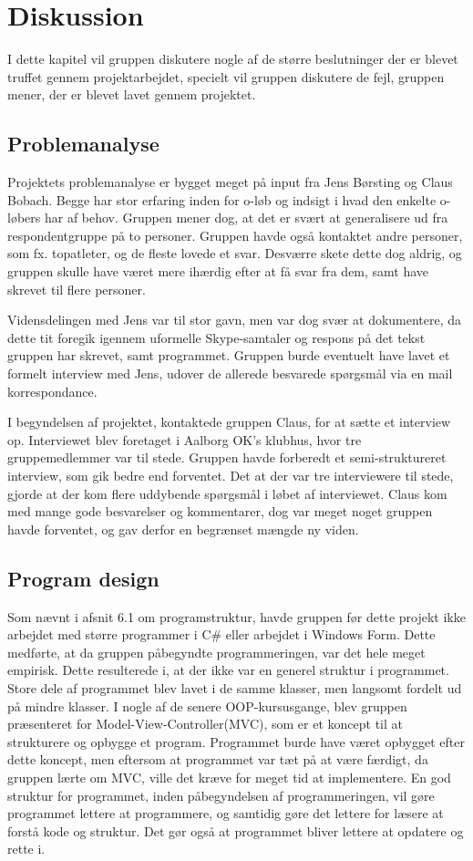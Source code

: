 \chapter{Diskussion}
I dette kapitel vil gruppen diskutere nogle af de større beslutninger der er blevet truffet gennem projektarbejdet, specielt vil gruppen diskutere de fejl, gruppen mener, der er blevet lavet gennem projektet. 
\section{Problemanalyse}
Projektets problemanalyse er bygget meget på input fra Jens Børsting og Claus Bobach. Begge har stor erfaring inden for o-løb og indsigt i hvad den enkelte o-løbers har af behov. Gruppen mener dog, at det er svært at generalisere ud fra respondentgruppe på to personer. Gruppen havde også kontaktet andre personer, som fx. topatleter, og de fleste lovede et svar. Desværre skete dette dog aldrig, og gruppen skulle have været mere ihærdig efter at få svar fra dem, samt have skrevet til flere personer. 

Vidensdelingen med Jens var til stor gavn, men var dog svær at dokumentere, da dette tit foregik igennem uformelle Skype-samtaler og respons på det tekst gruppen har skrevet, samt programmet. Gruppen burde eventuelt have lavet et formelt interview med Jens, udover de allerede besvarede spørgsmål via en mail korrespondance. 

I begyndelsen af projektet, kontaktede gruppen Claus, for at sætte et interview op. Interviewet blev foretaget i Aalborg OK’s klubhus, hvor tre gruppemedlemmer var til stede. Gruppen havde forberedt et semi-struktureret interview, som gik bedre end forventet. Det at der var tre interviewere til stede, gjorde at der kom flere uddybende spørgsmål i løbet af interviewet. Claus kom med mange gode besvarelser og kommentarer, dog var meget noget gruppen havde forventet, og gav derfor en begrænset mængde ny viden. 
\section{Program design}
Som nævnt i afsnit 6.1 om programstruktur, havde gruppen før dette projekt ikke arbejdet med større programmer i C\# eller arbejdet i Windows Form. Dette medførte, at da gruppen påbegyndte programmeringen, var det hele meget empirisk. Dette resulterede i, at der ikke var en generel struktur i programmet. Store dele af programmet blev lavet i de samme klasser, men langsomt fordelt ud på mindre klasser. I nogle af de senere OOP-kursusgange, blev gruppen præsenteret for Model-View-Controller(MVC), som er et koncept til at strukturere og opbygge et program. Programmet burde have været opbygget efter dette koncept, men eftersom at programmet var tæt på at være færdigt, da gruppen lærte om MVC, ville det kræve for meget tid at implementere.\newline
En god struktur for programmet, inden påbegyndelsen af programmeringen, vil gøre programmet lettere at programmere, og samtidig gøre det lettere for læsere at forstå kode og struktur. Det gør også at programmet bliver lettere at opdatere og rette i. 

